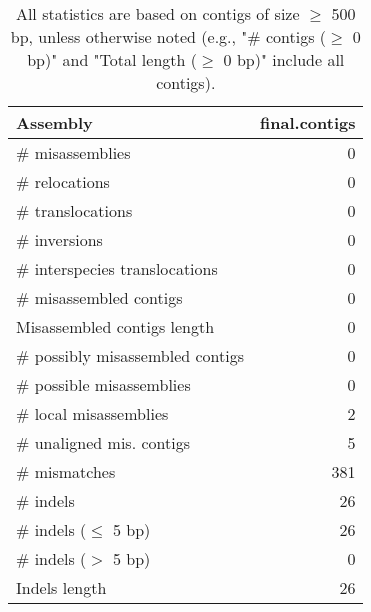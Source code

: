 \documentclass[12pt,a4paper]{article}
\begin{document}
\begin{table}[ht]
\begin{center}
\caption{All statistics are based on contigs of size $\geq$ 500 bp, unless otherwise noted (e.g., "\# contigs ($\geq$ 0 bp)" and "Total length ($\geq$ 0 bp)" include all contigs).}
\begin{tabular}{|l*{1}{|r}|}
\hline
Assembly & final.contigs \\ \hline
\# misassemblies & 0 \\ \hline
\hspace{5mm}\# relocations & 0 \\ \hline
\hspace{5mm}\# translocations & 0 \\ \hline
\hspace{5mm}\# inversions & 0 \\ \hline
\hspace{5mm}\# interspecies translocations & 0 \\ \hline
\# misassembled contigs & 0 \\ \hline
Misassembled contigs length & 0 \\ \hline
\# possibly misassembled contigs & 0 \\ \hline
\hspace{5mm}\# possible misassemblies & 0 \\ \hline
\# local misassemblies & 2 \\ \hline
\# unaligned mis. contigs & 5 \\ \hline
\# mismatches & 381 \\ \hline
\# indels & 26 \\ \hline
\hspace{5mm}\# indels ($\leq$ 5 bp) & 26 \\ \hline
\hspace{5mm}\# indels ($>$ 5 bp) & 0 \\ \hline
Indels length & 26 \\ \hline
\end{tabular}
\end{center}
\end{table}
\end{document}

